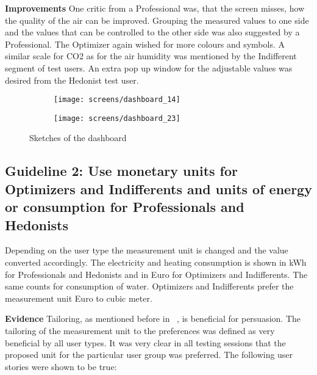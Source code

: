 \textbf{Improvements} \quad One critic from a Professional was, that the screen misses, how the quality of the air can be improved. Grouping the measured values to one side and the values that can be controlled to the other side was also suggested by a Professional. The Optimizer again wished for more colours and symbols. A similar scale for CO2 as for the air humidity was mentioned by the Indifferent segment of test users. An extra pop up window for the adjustable values was desired from the Hedonist test user.

\begin{figure}[h]
	\centering
	\begin{subfigure}[b]{0.24\columnwidth}
		\centering
		\texttt{[image: screens/dashboard\_14]}
		\label{fig:dasboard:professional}
	\end{subfigure}
	\begin{subfigure}[b]{0.24\columnwidth}
		\centering
		\texttt{[image: screens/dashboard\_23]}
		\label{fig:dashboard:optimizer}
	\end{subfigure}
	\caption{Sketches of the dashboard}
	\label{fig:dashboard} %
\end{figure}

\subsection*{Guideline 2: Use monetary units for Optimizers and Indifferents and units of energy or consumption for Professionals and Hedonists}

Depending on the user type the measurement unit is changed and the value converted accordingly. The electricity and heating consumption is shown in kWh for Professionals and Hedonists and in Euro for Optimizers and Indifferents. The same counts for consumption of water. Optimizers and Indifferents prefer the measurement unit Euro to cubic meter.

\textbf{Evidence} \quad Tailoring, as mentioned before in ~, is beneficial for persuasion. The tailoring of the measurement unit to the preferences was defined as very beneficial by all user types. It was very clear in all testing sessions that the proposed unit for the particular user group was preferred. The following user stories were shown to be true: 

